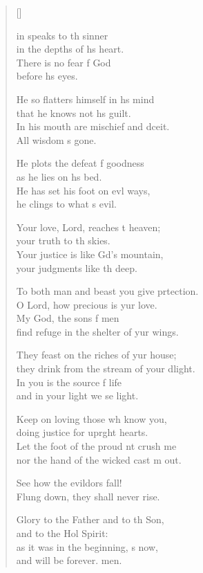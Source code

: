 \settowidth{\versewidth}{To both man and beast you give protection. *}
\begin{verse}[\versewidth]
  \begin{patverse}
    in speaks to th sinner\Med\\
in the depths of h\pointup{\i}s heart.\\
There is no fear f God\Med\\
before h\pointup{\i}s eyes.

He so flatters himself in h\pointup{\i}s mind\Med\\
that he knows not h\pointup{\i}s guilt.\\
In his mouth are mischief and dceit.\Med\\
All wisdom \pointup{\i}s gone.

He plots the defeat f goodness\Med\\
as he lies on h\pointup{\i}s bed.\\
He has set his foot on ev\pointup{\i}l ways,\Med\\
he clings to what \pointup{\i}s evil.

Your love, Lord, reaches t heaven;\Med\\
your truth to th skies.\\
Your justice is like Gd’s mountain,\Med\\
your judgments like th deep.

To both man and beast you give prtection.\Med\\
O Lord, how precious is yur love.\\
My God, the sons f men\Med\\
find refuge in the shelter of yur wings.

They feast on the riches of yur house;\Med\\
they drink from the stream of your dlight.\\
In you is the source f life\Med\\
and in your light we se light.

Keep on loving those wh know you,\Med\\
doing justice for upr\pointup{\i}ght hearts.\\
Let the foot of the proud nt crush me\Med\\
nor the hand of the wicked cast m out.

See how the evildors fall!\Med\\
Flung down, they shall never rise.

Glory to the Father and to th Son,\Med\\
and to the Hol Spirit:\\
as it was in the beginning, \pointup{\i}s now,\Med\\
and will be forever. men. 
  \end{patverse}
\end{verse}

